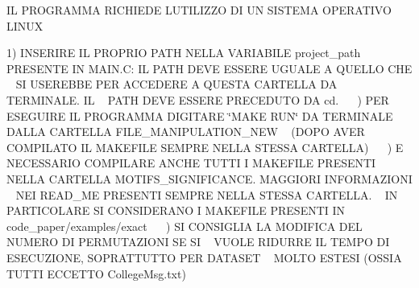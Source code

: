 \label{index_md_README}%
%
IL P\+R\+O\+G\+R\+A\+M\+MA R\+I\+C\+H\+I\+E\+DE L\textquotesingle{}U\+T\+I\+L\+I\+Z\+ZO DI UN S\+I\+S\+T\+E\+MA O\+P\+E\+R\+A\+T\+I\+VO L\+I\+N\+UX~\newline
\doxysubparagraph*{}

1) I\+N\+S\+E\+R\+I\+RE IL P\+R\+O\+P\+R\+IO P\+A\+TH N\+E\+L\+LA V\+A\+R\+I\+A\+B\+I\+LE project\+\_\+path ~\newline
 P\+R\+E\+S\+E\+N\+TE IN M\+A\+I\+N.\+C\+: IL P\+A\+TH D\+E\+VE E\+S\+S\+E\+RE U\+G\+U\+A\+LE A Q\+U\+E\+L\+LO C\+HE ~\newline
 SI U\+S\+E\+R\+E\+B\+BE P\+ER A\+C\+C\+E\+D\+E\+RE A Q\+U\+E\+S\+TA C\+A\+R\+T\+E\+L\+LA DA T\+E\+R\+M\+I\+N\+A\+LE. IL ~\newline
 P\+A\+TH D\+E\+VE E\+S\+S\+E\+RE P\+R\+E\+C\+E\+D\+U\+TO DA cd. ~\newline
~) P\+ER E\+S\+E\+G\+U\+I\+RE IL P\+R\+O\+G\+R\+A\+M\+MA D\+I\+G\+I\+T\+A\+RE \char`\"{}\+M\+A\+K\+E R\+U\+N\char`\"{} DA T\+E\+R\+M\+I\+N\+A\+LE ~\newline
 D\+A\+L\+LA C\+A\+R\+T\+E\+L\+LA F\+I\+L\+E\+\_\+\+M\+A\+N\+I\+P\+U\+L\+A\+T\+I\+O\+N\+\_\+\+N\+EW ~\newline
 (D\+O\+PO A\+V\+ER C\+O\+M\+P\+I\+L\+A\+TO IL M\+A\+K\+E\+F\+I\+LE S\+E\+M\+P\+RE N\+E\+L\+LA S\+T\+E\+S\+SA C\+A\+R\+T\+E\+L\+LA) ~\newline
~) E\textquotesingle{} N\+E\+C\+E\+S\+S\+A\+R\+IO C\+O\+M\+P\+I\+L\+A\+RE A\+N\+C\+HE T\+U\+T\+TI I M\+A\+K\+E\+F\+I\+LE P\+R\+E\+S\+E\+N\+TI ~\newline
 N\+E\+L\+LA C\+A\+R\+T\+E\+L\+LA M\+O\+T\+I\+F\+S\+\_\+\+S\+I\+G\+N\+I\+F\+I\+C\+A\+N\+CE. M\+A\+G\+G\+I\+O\+RI I\+N\+F\+O\+R\+M\+A\+Z\+I\+O\+NI ~\newline
 N\+EI R\+E\+A\+D\+\_\+\+ME P\+R\+E\+S\+E\+N\+TI S\+E\+M\+P\+RE N\+E\+L\+LA S\+T\+E\+S\+SA C\+A\+R\+T\+E\+L\+LA. ~\newline
 IN P\+A\+R\+T\+I\+C\+O\+L\+A\+RE SI C\+O\+N\+S\+I\+D\+E\+R\+A\+NO I M\+A\+K\+E\+F\+I\+LE P\+R\+E\+S\+E\+N\+TI IN ~\newline
 code\+\_\+paper/examples/exact ~\newline
~) SI C\+O\+N\+S\+I\+G\+L\+IA LA M\+O\+D\+I\+F\+I\+CA D\+EL N\+U\+M\+E\+RO DI P\+E\+R\+M\+U\+T\+A\+Z\+I\+O\+NI SE SI ~\newline
 V\+U\+O\+LE R\+I\+D\+U\+R\+RE IL T\+E\+M\+PO DI E\+S\+E\+C\+U\+Z\+I\+O\+NE, S\+O\+P\+R\+A\+T\+T\+U\+T\+TO P\+ER D\+A\+T\+A\+S\+ET ~\newline
 M\+O\+L\+TO E\+S\+T\+E\+SI (O\+S\+S\+IA T\+U\+T\+TI E\+C\+C\+E\+T\+TO College\+Msg.\+txt) ~\newline
 ~\newline


